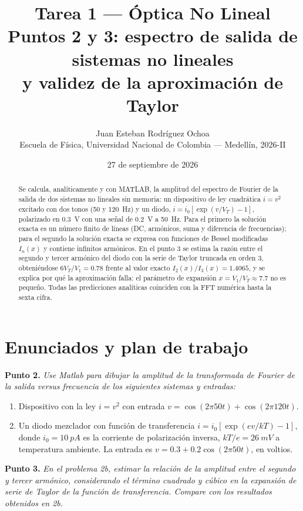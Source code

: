 \documentclass[11pt,letterpaper]{article}
\title{\textbf{Tarea 1 — Óptica No Lineal}\\[0.3em]
\large Puntos 2 y 3: espectro de salida de sistemas no lineales\\ y validez de la aproximación de Taylor}
\author{Juan Esteban Rodríguez Ochoa\\ \small Escuela de Física, Universidad Nacional de Colombia — Medellín, 2026-II}
\date{27 de septiembre de 2026}
\newcommand{\VT}{V_T}
\begin{document}
\maketitle

\begin{abstract}
\noindent Se calcula, analíticamente y con MATLAB, la amplitud del espectro de Fourier de la salida de
dos sistemas no lineales sin memoria: un dispositivo de ley cuadrática $i=v^2$ excitado con dos
tonos (50 y \SI{120}{Hz}) y un diodo, $i=i_0[\exp(v/\VT)-1]$, polarizado en \SI{0.3}{V} con una
señal de \SI{0.2}{V} a \SI{50}{Hz}. Para el primero la solución exacta es un número finito de líneas
(DC, armónicos, suma y diferencia de frecuencias); para el segundo la solución exacta se expresa con
funciones de Bessel modificadas $I_n(x)$ y contiene infinitos armónicos. En el punto 3 se estima la
razón entre el segundo y tercer armónico del diodo con la serie de Taylor truncada en orden 3,
obteniéndose $6\VT/V_1=0.78$ frente al valor exacto $I_2(x)/I_3(x)=1.4065$, y se explica por qué la
aproximación falla: el parámetro de expansión $x=V_1/\VT\approx7.7$ no es pequeño. Todas las
predicciones analíticas coinciden con la FFT numérica hasta la sexta cifra.
\end{abstract}

\tableofcontents
\newpage

\section{Enunciados y plan de trabajo}

\textbf{Punto 2.} \emph{Use Matlab para dibujar la amplitud de la transformada de Fourier de la salida
versus frecuencia de los siguientes sistemas y entradas:}
\begin{enumerate}
  \item[(a)] Dispositivo con la ley $i=v^2$ con entrada $v=\cos(2\pi 50t)+\cos(2\pi 120t)$.
  \item[(b)] Un diodo mezclador con función de transferencia $i=i_0\left[\exp(ev/kT)-1\right]$, donde
  $i_0=\SI{10}{pA}$ es la corriente de polarización inversa, $kT/e=\SI{26}{mV}$ a temperatura
  ambiente. La entrada es $v=0.3+0.2\cos(2\pi 50t)$, en voltios.
\end{enumerate}

\textbf{Punto 3.} \emph{En el problema 2b, estimar la relación de la amplitud entre el segundo y tercer
armónico, considerando el término cuadrado y cúbico en la expansión de serie de Taylor de la función de
transferencia. Compare con los resultados obtenidos en 2b.}
\end{document}
